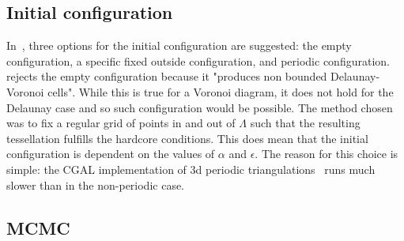 \documentclass[12pt,a4paper]{report}
\begin{document}
\subsection{Initial configuration}

In~\cite{DL10}, three options for the initial configuration are suggested: the empty configuration, a specific fixed outside configuration, and periodic configuration.~\cite{DL10} rejects the empty configuration because it "produces non bounded Delaunay-Voronoi cells". While this is true for a Voronoi diagram, it does not hold for the Delaunay case and so such configuration would be possible. 
The method chosen was to fix a regular grid of points in and out of $\Lambda$ such that the resulting tessellation fulfills the hardcore conditions. This does mean that the initial configuration is dependent on the values of $\alpha$ and $\epsilon$. The reason for this choice is simple: the CGAL implementation of 3d periodic triangulations~\cite{cgal:3d-period}  runs much slower than in the non-periodic case.


\subsection{MCMC}
\end{document}
